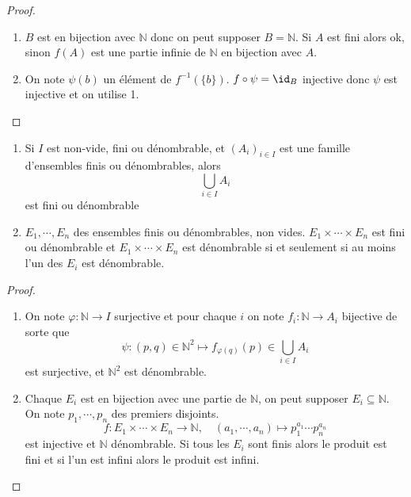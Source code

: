 \begin{proof}~
    \begin{enumerate}
        \item $B$ est en bijection avec $\mathbb N$ donc on peut supposer $B=\mathbb N$. Si $A$ est fini alors ok, sinon $f(A)$ est une partie infinie de $\mathbb N$ en bijection avec $A$.
        \item On note $\psi(b)$ un élément de $f^{-1}(\{b\})$. $f\circ \psi=\id_B$ injective donc $\psi$ est injective et on utilise 1.
    \end{enumerate}
\end{proof}

\begin{prop}
    \begin{enumerate}
        \item Si $I$ est non-vide, fini ou dénombrable, et $(A_i)_{i\in I}$ est une famille d'ensembles finis ou dénombrables, alors \[
                \bigcup_{i\in I}A_i
            \]
            est fini ou dénombrable
        \item $E_1,\cdots, E_n$ des ensembles finis ou dénombrables, non vides. $E_1\times \cdots \times E_n$ est fini ou dénombrable et $E_1\times \cdots \times E_n$ est dénombrable si et seulement si au moins l'un des $E_i$ est dénombrable.
    \end{enumerate}
\end{prop}

\begin{proof}~
    \begin{enumerate}
        \item On note $\varphi:\mathbb N\to I$ surjective et pour chaque $i$ on note $f_i:\mathbb N\to A_i$ bijective de sorte que \[
        \psi: (p, q)\in\mathbb N^2\longmapsto f_{\varphi(q)}(p)\in\bigcup_{i\in I}A_i
            \]
            est surjective, et $\mathbb N^2$ est dénombrable.
        \item Chaque $E_i$ est en bijection avec une partie de $\mathbb N$, on peut supposer $E_i\subseteq \mathbb N$. On note $p_1, \cdots, p_n$ des premiers disjoints. \[
                f: E_1\times \cdots \times E_n\longrightarrow \mathbb N, \quad (a_1, \cdots, a_n)\longmapsto p_1^{a_1}\cdots p_n^{a_n}
            \]
            est injective et $\mathbb N$ dénombrable. Si tous les $E_i$ sont finis alors le produit est fini et si l'un est infini alors le produit est infini.
    \end{enumerate}
\end{proof}

